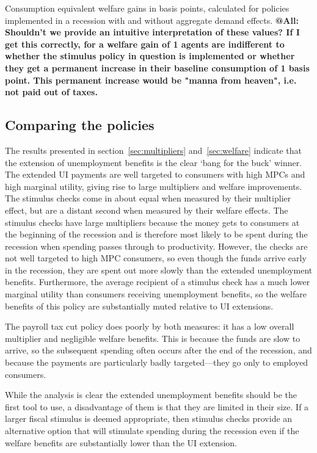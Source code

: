 \documentclass[../HAFiscal]{subfiles}
\begin{document}
\begin{table}[ht] 
	\center
	
	\caption{Consumption equivalent welfare gains in basis points, calculated for policies implemented in a recession with and without aggregate demand effects. \textbf{@All: Shouldn't we provide an intuitive interpretation of these values? If I get this correctly, for a welfare gain of 1 agents are indifferent to whether the stimulus policy in question is implemented or whether they get a permanent increase in their baseline consumption of 1 basis point. This permanent increase would be "manna from heaven", i.e. not paid out of taxes.} }
	\label{welfare}
\end{table}

\subsection{Comparing the policies} 

The results presented in section~\ref{sec:multipliers} and~\ref{sec:welfare} indicate that the extension of unemployment benefits is the clear `bang for the buck' winner. The extended UI payments are well targeted to consumers with high MPCs and high marginal utility, giving rise to large multipliers and welfare improvements. The stimulus checks come in about equal when measured by their multiplier effect, but are a distant second when measured by their welfare effects. The stimulus checks have large multipliers because the money gets to consumers at the beginning of the recession and is therefore most likely to be spent during the recession when spending passes through to productivity.  However, the checks are not well targeted to high MPC consumers, so even though the funds arrive early in the recession, they are spent out more slowly than the extended unemployment benefits. Furthermore, the average recipient of a stimulus check has a much lower marginal utility than consumers receiving unemployment benefits, so the welfare benefits of this policy are substantially muted relative to UI extensions.

The payroll tax cut policy does poorly by both measures: it has a low overall multiplier and negligible welfare benefits. This is because the funds are slow to arrive, so the subsequent spending often occurs after the end of the recession, and because the payments are particularly badly targeted---they go only to employed consumers.

While the analysis is clear the extended unemployment benefits should be the first tool to use, a disadvantage of them is that they are limited in their size. If a larger fiscal stimulus is deemed appropriate, then stimulus checks provide an alternative option that will stimulate spending during the recession even if the welfare benefits are substantially lower than the UI extension.
\end{document}
